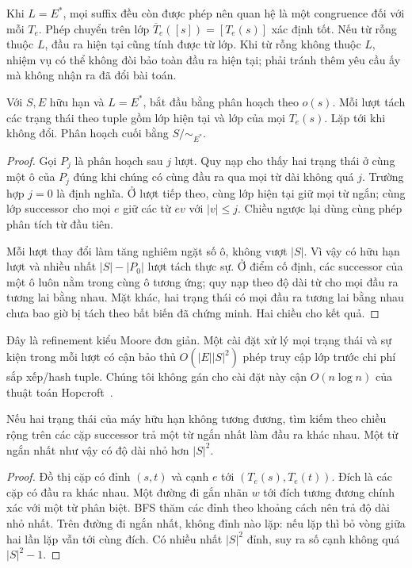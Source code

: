 Khi $L=E^*$, mọi suffix đều còn được phép nên quan hệ là một congruence đối với mỗi $T_e$. Phép chuyển trên lớp $\overline T_e([s])=[T_e(s)]$ xác định tốt. Nếu từ rỗng thuộc $L$, đầu ra hiện tại cũng tính được từ lớp. Khi từ rỗng không thuộc $L$, nhiệm vụ có thể không đòi bảo toàn đầu ra hiện tại; phải tránh thêm yêu cầu ấy mà không nhận ra đã đổi bài toán.

\begin{proposition}\label{prop:refinement}
Với $S,E$ hữu hạn và $L=E^*$, bắt đầu bằng phân hoạch theo $o(s)$. Mỗi lượt tách các trạng thái theo tuple gồm lớp hiện tại và lớp của mọi $T_e(s)$. Lặp tới khi không đổi. Phân hoạch cuối bằng $S/{\sim_{E^*}}$.
\end{proposition}
\begin{proof}
Gọi $P_j$ là phân hoạch sau $j$ lượt. Quy nạp cho thấy hai trạng thái ở cùng một ô của $P_j$ đúng khi chúng có cùng đầu ra qua mọi từ dài không quá $j$. Trường hợp $j=0$ là định nghĩa. Ở lượt tiếp theo, cùng lớp hiện tại giữ mọi từ ngắn; cùng lớp successor cho mọi $e$ giữ các từ $ev$ với $|v|\le j$. Chiều ngược lại dùng cùng phép phân tích từ đầu tiên.

Mỗi lượt thay đổi làm tăng nghiêm ngặt số ô, không vượt $|S|$. Vì vậy có hữu hạn lượt và nhiều nhất $|S|-|P_0|$ lượt tách thực sự. Ở điểm cố định, các successor của một ô luôn nằm trong cùng ô tương ứng; quy nạp theo độ dài từ cho mọi đầu ra tương lai bằng nhau. Mặt khác, hai trạng thái có mọi đầu ra tương lai bằng nhau chưa bao giờ bị tách theo bất biến đã chứng minh. Hai chiều cho kết quả.
\end{proof}
Đây là refinement kiểu Moore đơn giản. Một cài đặt xử lý mọi trạng thái và sự kiện trong mỗi lượt có cận bảo thủ $O(|E||S|^2)$ phép truy cập lớp trước chi phí sắp xếp/hash tuple. Chúng tôi không gán cho cài đặt này cận $O(n\log n)$ của thuật toán Hopcroft~\cite{hopcroft}.

\begin{proposition}\label{prop:witness}
Nếu hai trạng thái của máy hữu hạn không tương đương, tìm kiếm theo chiều rộng trên các cặp successor trả một từ ngắn nhất làm đầu ra khác nhau. Một từ ngắn nhất như vậy có độ dài nhỏ hơn $|S|^2$.
\end{proposition}
\begin{proof}
Đồ thị cặp có đỉnh $(s,t)$ và cạnh $e$ tới $(T_e(s),T_e(t))$. Đích là các cặp có đầu ra khác nhau. Một đường đi gắn nhãn $w$ tới đích tương đương chính xác với một từ phân biệt. BFS thăm các đỉnh theo khoảng cách nên trả độ dài nhỏ nhất. Trên đường đi ngắn nhất, không đỉnh nào lặp: nếu lặp thì bỏ vòng giữa hai lần lặp vẫn tới cùng đích. Có nhiều nhất $|S|^2$ đỉnh, suy ra số cạnh không quá $|S|^2-1$.
\end{proof}

